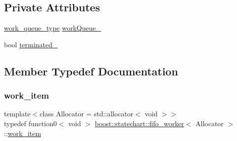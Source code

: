 \subsection*{Private Attributes}
\begin{DoxyCompactItemize}
\item 
\mbox{\hyperlink{classboost_1_1statechart_1_1fifo__worker_a59c84b45f3d55dfdd63e7627d0fa2e7b}{work\+\_\+queue\+\_\+type}} \mbox{\hyperlink{classboost_1_1statechart_1_1fifo__worker_a26eeadc0a18615679e035b393b5dee2c}{work\+Queue\+\_\+}}
\item 
bool \mbox{\hyperlink{classboost_1_1statechart_1_1fifo__worker_a4fa42fb70ad8cf4ddc71c5792f03ba5e}{terminated\+\_\+}}
\end{DoxyCompactItemize}


\subsection{Member Typedef Documentation}
\mbox{\label{classboost_1_1statechart_1_1fifo__worker_ac90f6805565bb3e8d65e4cdde96d90c2}} 
\subsubsection{\texorpdfstring{work\+\_\+item}{work\_item}}
{\footnotesize\ttfamily template$<$class Allocator = std\+::allocator$<$ void $>$$>$ \\
typedef function0$<$ void $>$ \mbox{\hyperlink{classboost_1_1statechart_1_1fifo__worker}{boost\+::statechart\+::fifo\+\_\+worker}}$<$ Allocator $>$\+::\mbox{\hyperlink{classboost_1_1statechart_1_1fifo__worker_ac90f6805565bb3e8d65e4cdde96d90c2}{work\+\_\+item}}}

\mbox{\label{classboost_1_1statechart_1_1fifo__worker_a59c84b45f3d55dfdd63e7627d0fa2e7b}} 
